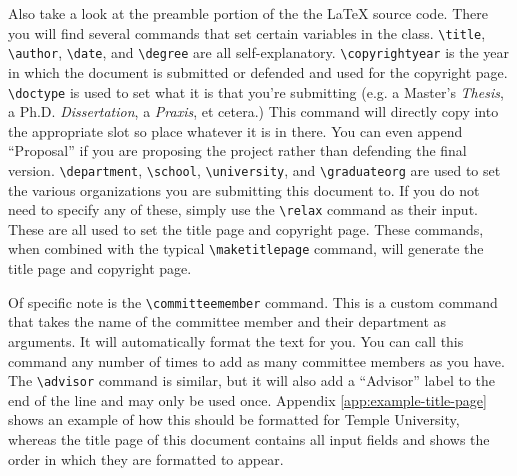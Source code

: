 \documentclass{thesis-dissertation}
\begin{document}
Also take a look at the preamble portion of the the \LaTeX{} source code. There you will find several commands that set certain variables in the class. \verb|\title|, \verb|\author|, \verb|\date|, and \verb|\degree| are all self-explanatory. \verb|\copyrightyear| is the year in which the document is submitted or defended and used for the copyright page. \verb|\doctype| is used to set what it is that you're submitting (e.g. a Master's \textit{Thesis}, a Ph.D. \textit{Dissertation}, a \textit{Praxis}, et cetera.) This command will directly copy into the appropriate slot so place whatever it is in there. You can even append ``Proposal'' if you are proposing the project rather than defending the final version. \verb|\department|, \verb|\school|, \verb|\university|, and \verb|\graduateorg| are used to set the various organizations you are submitting this document to. If you do not need to specify any of these, simply use the \verb|\relax| command as their input. These are all used to set the title page and copyright page. These commands, when combined with the typical \verb|\maketitlepage| command, will generate the title page and copyright page. 

Of specific note is the \verb|\committeemember| command. This is a custom command that takes the name of the committee member and their department as arguments. It will automatically format the text for you. You can call this command any number of times to add as many committee members as you have. The \verb|\advisor| command is similar, but it will also add a ``Advisor'' label to the end of the line and may only be used once. Appendix \ref{app:example-title-page} shows an example of how this should be formatted for Temple University, whereas the title page of this document contains all input fields and shows the order in which they are formatted to appear.
\end{document}

